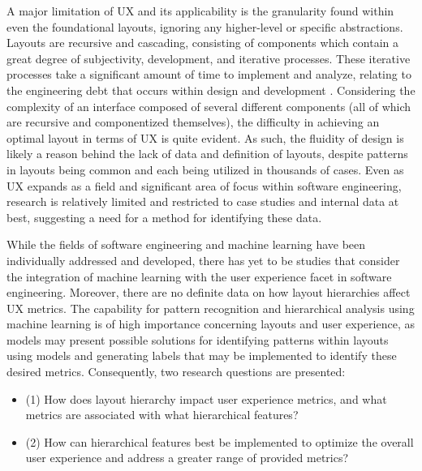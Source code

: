 A major limitation of UX and its applicability is the granularity found within even the foundational layouts, ignoring any higher-level or specific abstractions. Layouts are recursive and cascading, consisting of components which contain a great degree of subjectivity, development, and iterative processes. These iterative processes take a significant amount of time to implement and analyze, relating to the engineering debt that occurs within design and development \cite{4293575}. Considering the complexity of an interface composed of several different components (all of which are recursive and componentized themselves), the difficulty in achieving an optimal layout in terms of UX is quite evident. As such, the fluidity of design is likely a reason behind the lack of data and definition of layouts, despite patterns in layouts being common and each being utilized in thousands of cases. Even as UX expands as a field and significant area of focus within software engineering, research is relatively limited and restricted to case studies and internal data at best, suggesting a need for a method for identifying these data.

While the fields of software engineering and machine learning have been individually addressed and developed, there has yet to be studies that consider the integration of machine learning with the user experience facet in software engineering. Moreover, there are no definite data on how layout hierarchies affect UX metrics. The capability for pattern recognition and hierarchical analysis using machine learning is of high importance concerning layouts and user experience, as models may present possible solutions for identifying patterns within layouts using models and generating labels that may be implemented to identify these desired metrics. Consequently, two research questions are presented:

\renewcommand{\labelitemi}{$\textendash$}
\begin{itemize}
    \item (1) How does layout hierarchy impact user experience metrics, and what metrics are associated with what hierarchical features?
    \item (2) How can hierarchical features best be implemented to optimize the overall user experience and address a greater range of provided metrics?
\end{itemize}



